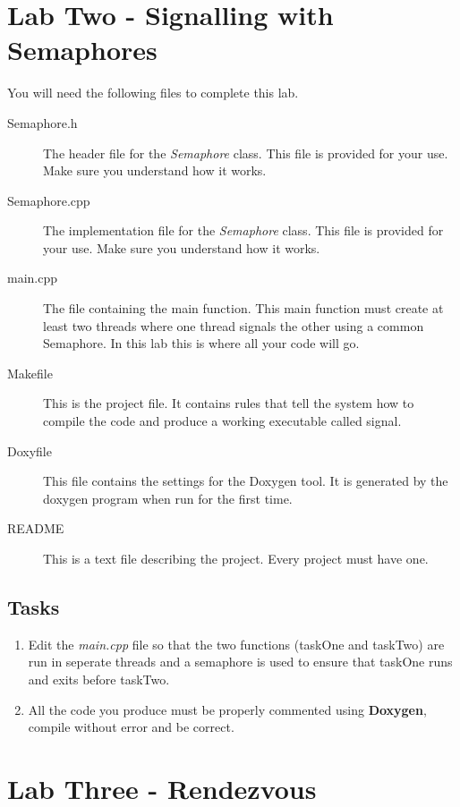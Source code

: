 \documentclass[10pt,a4paper]{article}
\begin{document}
\section{Lab Two - Signalling with Semaphores}
You will need the following files to complete this lab.
\begin{description}
\item[Semaphore.h] The header file for the \textit{Semaphore} class.  This file is provided for your use.  Make sure you understand how it works.
\item[Semaphore.cpp] The implementation file for the \textit{Semaphore} class.  This file is provided for your use.  Make sure you understand how it works.
\item[main.cpp] The file containing the main function.  This main function must create at least two threads where one thread signals the other using a common Semaphore.  In this lab this is where all your code will go.
\item[Makefile] This is the project file. It contains rules that tell the system how to compile the code and produce a working executable called signal.
\item[Doxyfile] This file contains the settings for the Doxygen tool. It is generated by the doxygen program when run for the first time.
\item[README] This is a text file describing the project. Every project must have one.
\end{description}

\subsection{Tasks}
\begin{enumerate}
\item Edit the \textit{main.cpp} file so that the two functions (taskOne and taskTwo) are run in seperate threads and a semaphore is used to ensure that taskOne runs and exits before taskTwo.
\item All the code you produce must be properly commented using \textbf{Doxygen}, compile without error and be correct.
\end{enumerate}



 
 \section{Lab Three - Rendezvous}
\end{document}
